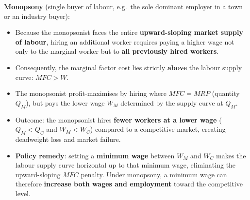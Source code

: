 \documentclass[a4paper,12pt]{article}
\begin{document}
\textbf{Monopsony} (single buyer of labour, e.g.\ the sole dominant employer in a town or an industry buyer):
\begin{itemize}
  \item Because the monopsonist faces the entire \textbf{upward-sloping market supply of labour}, hiring an additional worker requires paying a higher wage not only to the marginal worker but to \textbf{all previously hired workers}.
  \item Consequently, the marginal factor cost lies strictly \textbf{above} the labour supply curve: $MFC > W$.
  \item The monopsonist profit-maximises by hiring where $MFC = MRP$ (quantity $Q_M$), but pays the lower wage $W_M$ determined by the supply curve at $Q_M$.
  \item Outcome: the monopsonist hires \textbf{fewer workers at a lower wage} ($Q_M < Q_C$ and $W_M < W_C$) compared to a competitive market, creating deadweight loss and market failure.
  \item \textbf{Policy remedy}: setting a \textbf{minimum wage} between $W_M$ and $W_C$ makes the labour supply curve horizontal up to that minimum wage, eliminating the upward-sloping $MFC$ penalty. Under monopsony, a minimum wage can therefore \textbf{increase both wages and employment} toward the competitive level.
\end{itemize}
\begin{center}
\end{center}
\newpage
\end{document}
